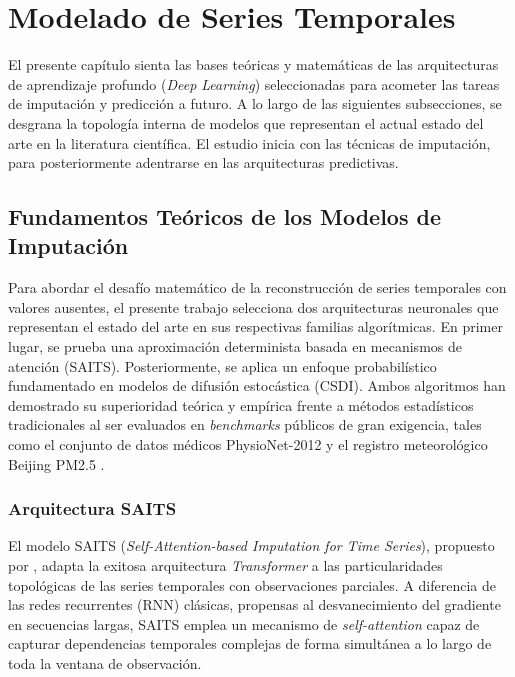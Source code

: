 \section{Modelado de Series Temporales}

El presente capítulo sienta las bases teóricas y matemáticas de las arquitecturas de aprendizaje profundo (\textit{Deep Learning}) seleccionadas para acometer las tareas de imputación y predicción a futuro. A lo largo de las siguientes subsecciones, se desgrana la topología interna de modelos que representan el actual estado del arte en la literatura científica. El estudio inicia con las técnicas de imputación, para posteriormente adentrarse en las arquitecturas predictivas. 


\subsection{Fundamentos Teóricos de los Modelos de Imputación}
\label{sec:theoretical_framework}

Para abordar el desafío matemático de la reconstrucción de series temporales con valores ausentes, el presente trabajo selecciona dos arquitecturas neuronales que representan el estado del arte en sus respectivas familias algorítmicas. En primer lugar, se prueba una aproximación determinista basada en mecanismos de atención (SAITS). Posteriormente, se aplica un enfoque probabilístico fundamentado en modelos de difusión estocástica (CSDI). Ambos algoritmos han demostrado su superioridad teórica y empírica frente a métodos estadísticos tradicionales al ser evaluados en \textit{benchmarks} públicos de gran exigencia, tales como el conjunto de datos médicos PhysioNet-2012 \parencite{silva2012predicting} y el registro meteorológico Beijing PM2.5 \parencite{liang2015assessing}.

\subsubsection{Arquitectura SAITS}

El modelo SAITS (\textit{Self-Attention-based Imputation for Time Series}), propuesto por \textcite{du2023saits}, adapta la exitosa arquitectura \textit{Transformer} \parencite{vaswani2017attention} a las particularidades topológicas de las series temporales con observaciones parciales. A diferencia de las redes recurrentes (RNN) clásicas, propensas al desvanecimiento del gradiente en secuencias largas, SAITS emplea un mecanismo de \textit{self-attention} capaz de capturar dependencias temporales complejas de forma simultánea a lo largo de toda la ventana de observación.


